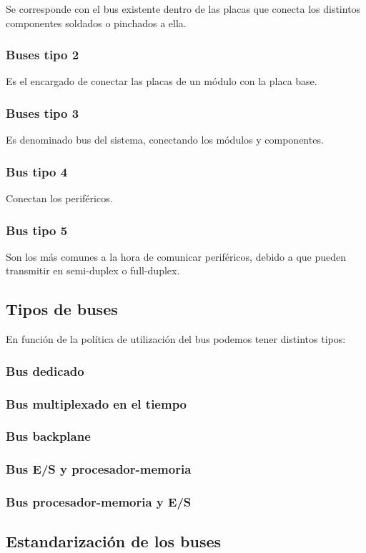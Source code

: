 \documentclass[a4paper, 11pt, titlepage]{article}
\begin{document}
            Se corresponde con el bus existente dentro de las placas que conecta los distintos componentes 
            soldados o pinchados a ella.

        \subsubsection{Buses tipo 2}

            Es el encargado de conectar las placas de un módulo con la placa base.

        \subsubsection{Buses tipo 3}

            Es denominado bus del sistema, conectando los módulos y componentes.

        \subsubsection{Bus tipo 4}

            Conectan los periféricos.

        \subsubsection{Bus tipo 5}

            Son los más comunes a la hora de comunicar periféricos, debido a que pueden transmitir en 
            semi-duplex o full-duplex.

    \subsection{Tipos de buses}

        En función de la política de utilización del bus podemos tener distintos tipos:

        \subsubsection{Bus dedicado}

        \subsubsection{Bus multiplexado en el tiempo}

        \subsubsection{Bus backplane}

        \subsubsection{Bus E/S y procesador-memoria}

        \subsubsection{Bus procesador-memoria y E/S}

    \subsection{Estandarización de los buses}
\end{document}
